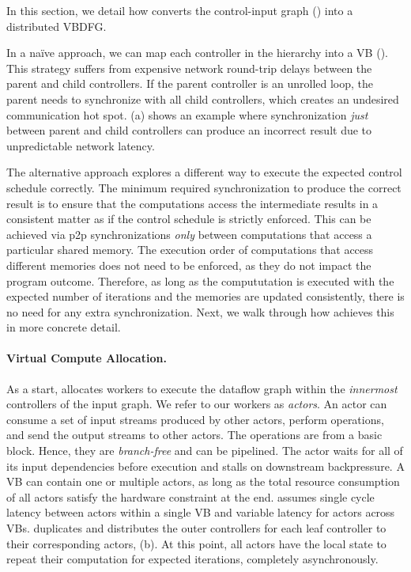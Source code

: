 In this section, we detail how \name{} converts the control-input graph () into a distributed VBDFG.

In a na\"ive approach, we can map each controller in the hierarchy into a VB ().
This strategy suffers from expensive network round-trip delays between the parent and child controllers.
If the parent controller is an unrolled loop, the parent needs to synchronize with all child controllers, which creates an undesired communication hot spot.
(a) shows an example where synchronization {\em just} between parent and child controllers can produce an incorrect result due to unpredictable network latency.

The alternative approach explores a different way to execute the expected control schedule correctly. 
The minimum required synchronization to produce the correct result is to ensure that the computations access the intermediate results in a consistent matter as if the control schedule is strictly enforced. 
This can be achieved via p2p synchronizations \emph{only} between computations that access a particular shared memory.
The execution order of computations that access different memories does not need to be enforced, as they do not impact the program outcome.
Therefore, as long as the compututation is executed with the expected number of iterations and the memories are updated consistently, there is no need for any extra synchronization.
Next, we walk through how \name{} achieves this in more concrete detail.

\paragraph{Virtual Compute Allocation.}
As a start, \name{} allocates workers to execute the dataflow graph within the \emph{innermost} controllers of the input graph.
We refer to our workers as {\em actors}. 
An actor can consume a set of input streams produced by other actors, perform operations, and send the output streams to other actors. 
The operations are from a basic block. Hence, they are \emph{branch-free} and can be pipelined.
The actor waits for all of its input dependencies before execution and stalls on downstream backpressure.
A VB can contain one or multiple actors, as long as the total resource consumption of all actors satisfy the hardware constraint at the end.
\name assumes single cycle latency between actors within a single VB and variable latency for actors across VBs.
\name duplicates and distributes the outer controllers for each leaf controller to their corresponding actors, (b).
At this point, all actors have the local state to repeat their computation for expected iterations, completely asynchronously.

